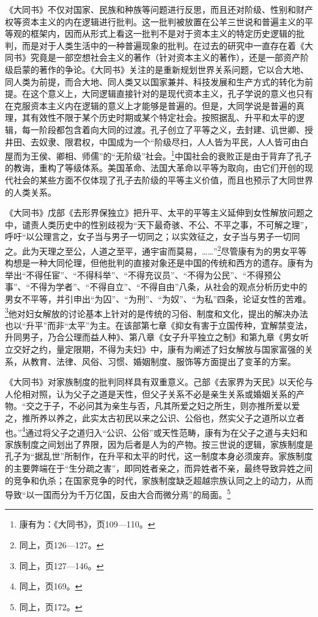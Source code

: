 \documentclass[a4paper, 12pt, openright]{ctexbook}
\begin{document}
《大同书》不仅对国家、民族和种族等问题进行反思，而且还对阶级、性别和财产权等资本主义的内在逻辑进行批判。这一批判被放置在公羊三世说和普遍主义的平等观的框架内，因而从形式上看这一批判不是对于资本主义的特定历史逻辑的批判，而是对于人类生活中的一种普遍现象的批判。在过去的研究中一直存在着《大同书》究竟是一部空想社会主义的著作（针对资本主义的著作），还是一部资产阶级启蒙的著作的争论。《大同书》关注的是重新规划世界关系问题，它以合大地、同人类为前提，而合大地、同人类又以国家兼并、科技发展和生产方式的转化为前提。在这个意义上，大同逻辑直接针对的是现代资本主义，孔子学说的意义也只有在克服资本主义内在逻辑的意义上才能够是普遍的。但是，大同学说是普遍的真理，其有效性不限于某个历史时期或某个特定社会。按照据乱、升平和太平的逻辑，每一阶段都包含着向大同的过渡。孔子创立了平等之义，去封建、讥世卿、授井田、去奴隶、限君权，中国成为一个“阶级尽扫，人人皆为平民，人人皆可由白屋而为王侯、卿相、师儒”的“无阶级”社会。\footnote{康有为：《大同书》，页109—110。}中国社会的衰败正是由于背弃了孔子的教诲，重构了等级体系。美国革命、法国大革命以平等为取向，由它们开创的现代社会的某些方面不仅体现了孔子去阶级的平等主义价值，而且也预示了大同世界的人类关系。

《大同书》戊部《去形界保独立》把升平、太平的平等主义延伸到女性解放问题之中，谴责人类历史中的性别歧视为“天下最奇骇、不公、不平之事，不可解之理”，呼吁“以公理言之，女子当与男子一切同之；以实效征之，女子当与男子一切同之。此为天理之至公，人道之至平，通宇宙而莫易，……”\footnote{同上，页126—127。}尽管康有为的男女平等构想是一种大同伦理，但他批判的直接对象还是中国的传统和西方的遗存。康有为举出“不得任宦”、“不得科举”、“不得充议员”、“不得为公民”、“不得预公事”、“不得为学者”、“不得自立”、“不得自由”八条，从社会的观点分析历史中的男女不平等，并引申出“为囚”、“为刑”、“为奴”、“为私”四条，论证女性的苦难。\footnote{同上，页127—146。}他对妇女解放的讨论基本上针对的是传统的习俗、制度和文化，提出的解决办法也以“升平”而非“太平”为主。在该部第七章《抑女有害于立国传种，宜解禁变法，升同男子，乃合公理而益人种》、第八章《女子升平独立之制》和第九章《男女听立交好之约，量定限期，不得为夫妇》中，康有为阐述了妇女解放与国家富强的关系，从教育、法律、风俗、习惯、婚姻制度、服饰等方面提出了变革的方案。

《大同书》对家族制度的批判同样具有双重意义。己部《去家界为天民》以天伦与人伦相对照，认为父子之道是天性，但父子关系不必是亲生关系或婚姻关系的产物。“交之于子，不必问其为亲生与否，凡其所爱之妇之所生，则亦推所爱以爱之，推所养以养之，此实太古初民以来之公识、公俗也，然实父子之道所以立者也。”\footnote{同上，页169。}通过将父子之道归入“公识、公俗”或天性范畴，康有为在父子之道与夫妇和家族制度之间划出了界限，因为后者是人为的产物。按三世说的逻辑，家族制度是孔子为“据乱世”所制作，在升平和太平的时代，这一制度本身必须废弃。家族制度的主要弊端在于“生分疏之害”，即同姓者亲之，而异姓者不亲，最终导致异姓之间的竞争和仇杀；在国家竞争的时代，家族制度缺乏超越宗族认同之上的动力，从而导致“以一国而分为千万亿国，反由大合而微分焉”的局面。\footnote{同上，页172。}
\end{document}

